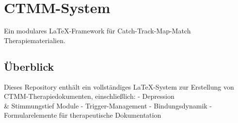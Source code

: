 \hypertarget{ctmm-system}{%
\section{CTMM-System}\label{ctmm-system}}

Ein modulares LaTeX-Framework für Catch-Track-Map-Match Therapiematerialien.

\hypertarget{uxfcberblick}{%
\subsection{Überblick}\label{uxfcberblick}}

Dieses Repository enthält ein vollständiges LaTeX-System zur Erstellung von CTMM-Therapiedokumenten, einschließlich:
- Depression \\& Stimmungstief Module
- Trigger-Management
- Bindungsdynamik
- Formularelemente für therapeutische Dokumentation